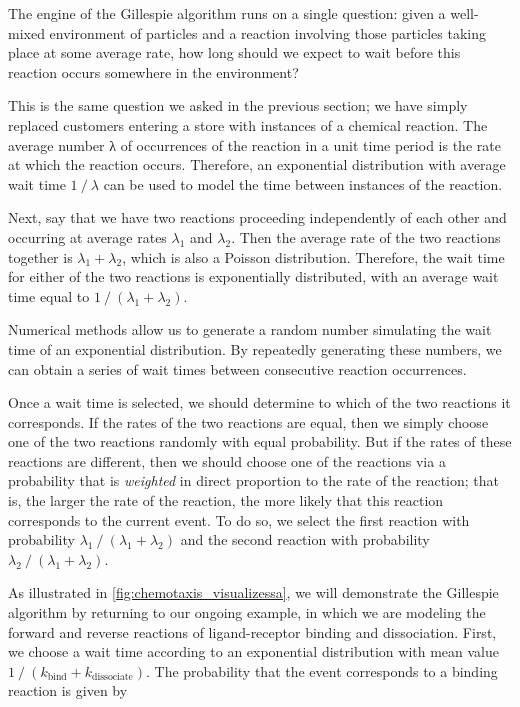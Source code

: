 The engine of the Gillespie algorithm runs on a single question: given a well-mixed environment of particles and a reaction involving those particles taking place at some average rate, how long should we expect to wait before this reaction occurs somewhere in the environment?

This is the same question we asked in the previous section; we have simply replaced customers entering a store with instances of a chemical reaction. The average number λ of occurrences of the reaction in a unit time period is the rate at which the reaction occurs. Therefore, an exponential distribution with average wait time $1\mathbin{/}\lambda$ can be used to model the time between instances of the reaction.

Next, say that we have two reactions proceeding independently of each other and occurring at average rates $\lambda_1$ and $\lambda_2$. Then the average rate of the two reactions together is $\lambda_1 + \lambda_2$, which is also a Poisson distribution. Therefore, the wait time for either of the two reactions is exponentially distributed, with an average wait time equal to $1\mathbin{/}(\lambda_1 + \lambda_2)$.

Numerical methods allow us to generate a random number simulating the wait time of an exponential distribution. By repeatedly generating these numbers, we can obtain a series of wait times between consecutive reaction occurrences.

Once a wait time is selected, we should determine to which of the two reactions it corresponds. If the rates of the two reactions are equal, then we simply choose one of the two reactions randomly with equal probability. But if the rates of these reactions are different, then we should choose one of the reactions via a probability that is \textit{weighted} in direct proportion to the rate of the reaction; that is, the larger the rate of the reaction, the more likely that this reaction corresponds to the current event. To do so, we select the first reaction with probability $\lambda_1\mathbin{/}(\lambda_1 + \lambda_2)$ and the second reaction with probability $\lambda_2\mathbin{/}(\lambda_1 + \lambda_2)$.\\

\begin{qbox}\end{qbox}

As illustrated in \autoref{fig:chemotaxis_visualizessa}, we will demonstrate the Gillespie algorithm by returning to our ongoing example, in which we are modeling the forward and reverse reactions of ligand-receptor binding and dissociation. First, we choose a wait time according to an exponential distribution with mean value $1\mathbin{/}(k_\text{bind} + k_\text{dissociate})$. The probability that the event corresponds to a binding reaction is given by

